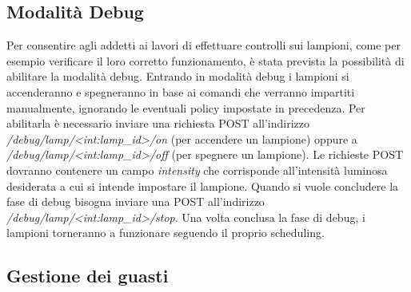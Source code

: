 \subsection{Modalità Debug}
Per consentire agli addetti ai lavori di effettuare controlli sui lampioni, come per esempio verificare il loro corretto funzionamento, è stata prevista la possibilità di abilitare la modalità debug.
Entrando in modalità debug i lampioni si accenderanno e spegneranno in base ai comandi che verranno impartiti manualmente, ignorando le eventuali policy impostate in precedenza.
Per abilitarla è necessario inviare una richiesta POST all'indirizzo \textit{/debug/lamp/<int:lamp\_id>/on} (per accendere un lampione) oppure a \textit{/debug/lamp/<int:lamp\_id>/off} (per spegnere un lampione).
Le richieste POST dovranno contenere un campo \textit{intensity} che corrisponde all'intensità luminosa desiderata a cui si intende impostare il lampione.
Quando si vuole concludere la fase di debug bisogna inviare una POST all'indirizzo \textit{/debug/lamp/<int:lamp\_id>/stop}.
Una volta conclusa la fase di debug, i lampioni torneranno a funzionare seguendo il proprio scheduling.

\subsection{Gestione dei guasti}


